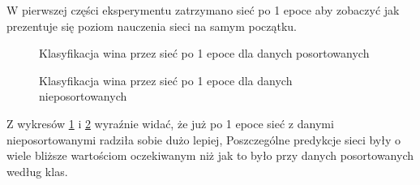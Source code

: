 \documentclass[a4paper,12pt]{article}
\numberwithin{equation}{section}
\begin{document}
W pierwszej części eksperymentu zatrzymano sieć po 1 epoce aby zobaczyć jak prezentuje się poziom nauczenia sieci na samym początku.\\

\begin{figure}[h]
    \centering


    \caption{Klasyfikacja wina przez sieć po 1 epoce dla danych posortowanych}
    \label{fig:exp_2_sort}
    \vspace{0.5cm}
\end{figure}

\begin{figure}[H]
    \centering


    \caption{Klasyfikacja wina przez sieć po 1 epoce dla danych nieposortowanych}
    \label{fig:exp_2_shuffle}
\end{figure}

Z wykresów \ref{fig:exp_2_sort} i \ref{fig:exp_2_shuffle} wyraźnie widać, że już po 1 epoce sieć z danymi nieposortowanymi radziła sobie dużo lepiej, Poszczególne predykcje sieci były o wiele bliższe wartościom oczekiwanym niż jak to było przy danych posortowanych według klas.
\end{document}
